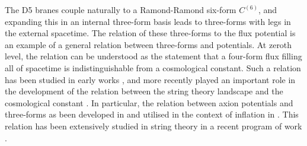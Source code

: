 \documentclass[11pt,a4paper]{article}
\numberwithin{equation}{section}
\numberwithin{table}{section}\setlength{\multlinegap}{25pt}
\begin{document}
{The D5 branes couple naturally to a Ramond-Ramond six-form $C^{(6)}$, and expanding this in an internal three-form basis leads to three-forms with legs in the external spacetime. The relation of these three-forms to the flux potential is an example of a general relation between three-forms and potentials. At zeroth level, the relation can be understood as the statement that a four-form flux filling all of spacetime is indistinguishable from a cosmological constant. Such a relation has been studied in early works \cite{Duff:1980qv,Hawking:1984hk,Duff:1989ah}, and more recently played an important role in the development of the relation between the string theory landscape and the cosmological constant \cite{Bousso:2000xa}. In particular, the relation between axion potentials and three-forms as been developed in \cite{Dvali:2004tma,Dvali:2005an,Dvali:2005zk,Dvali:2013cpa} and utilised in the context of inflation in \cite{Kaloper:2008fb,Kaloper:2011jz}. This relation has been extensively studied in string theory in a recent program of work \cite{Dudas:2014pva,Bielleman:2015ina,Escobar:2015ckf,Ibanez:2015fcv,Garcia-Valdecasas:2016voz,Carta:2016ynn,Herraez:2016dxn,Valenzuela:2016yny,Bielleman:2016olv,Blumenhagen:2017cxt,Tenreiro:2017fon,Valenzuela:2017bvg,Farakos:2017jme,LandeteMarcos:2017wky,Farakos:2017ocw,Herraez:2018vae,Bandos:2018gjp,Nitta:2018yzb,Escobar:2018tiu,Escobar:2018rna}. 

}
\end{document}
